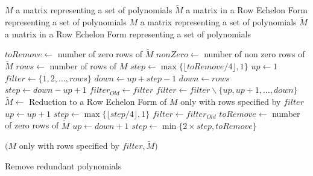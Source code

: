 \begin{algorithm}[!ht]
  \begin{algorithmic}[1]
    \Require
      \Statex $M$ a matrix representing a set of polynomials
      \Statex $\tilde{M}$ a matrix in a Row Echelon Form representing a set of polynomials
    \Ensure
      \Statex $M$ a matrix representing a set of polynomials
      \Statex $\tilde{M}$ a matrix in a Row Echelon Form representing a set of polynomials
      \Statex

      \State $toRemove \gets $ number of zero rows of $\tilde{M}$
      \State $nonZero \gets$ number of non zero rows of $\tilde{M}$
      \State $rows \gets$ number of rows of $M$
      \State $step \gets \max\{\lfloor toRemove/4\rfloor, 1\}$ 
      \State $up \gets 1$
      \State $filter \gets \{1,2,\dots,rows\}$
        \State $down \gets up + step - 1$
          \State $down \gets rows$
	  \State $step \gets down - up + 1$
	\EndIf
	\State $filter_{Old} \gets filter$
	\State $filter \gets filter \backslash \{up, up+1, \dots, down\}$
	\State $\tilde{M} \gets$ Reduction to a Row Echelon Form of $M$ only with rows specified by $filter$
	    \State $up \gets up + 1$
	  \Else
            \State $step \gets \max\{\lfloor step/4\rfloor, 1\}$
	  \EndIf
	  \State $filter \gets filter_{Old}$
	\Else
	  \State $toRemove \gets$ number of zero rows of $\tilde{M}$
          \State $up \gets down + 1$
	  \State $step \gets \min\{2\times step, toRemove\}$
	\EndIf
      \EndWhile

      \State \Return $(M$ only with rows specified by $filter, \tilde{M})$
  \end{algorithmic}
  \caption{Remove redundant polynomials}
  \label{alg:removeRedundant}
\end{algorithm}


